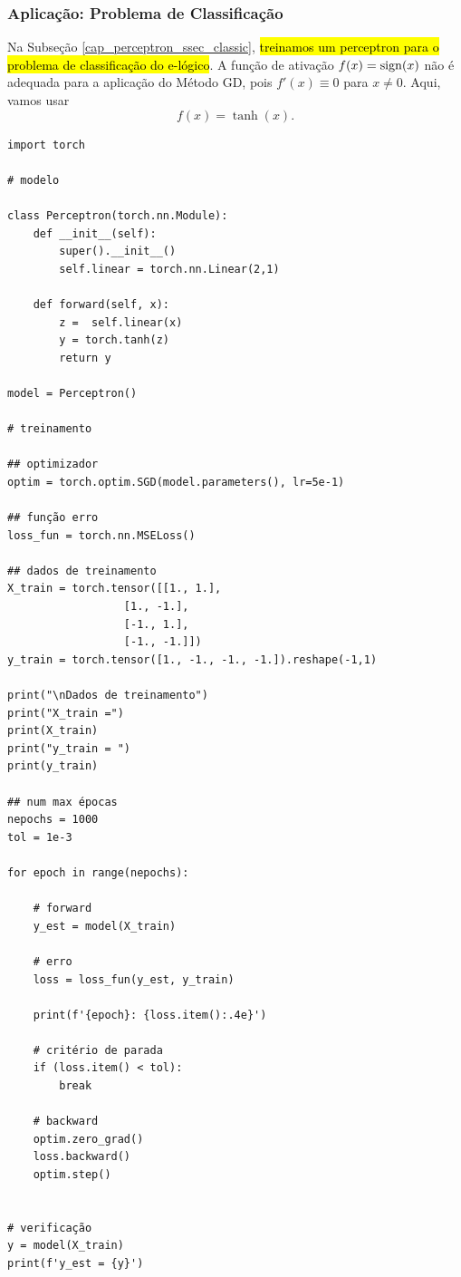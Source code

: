 \subsubsection{Aplicação: Problema de Classificação}

Na Subseção \ref{cap_perceptron_ssec_classic}, \hl{treinamos um perceptron para o problema de classificação do e-lógico}. A função de ativação $f(x) = \operatorname{sign}(x)$ não é adequada para a aplicação do Método GD, pois $f'(x) \equiv 0$ para $x\neq 0$. Aqui, vamos usar
\begin{equation}
  f(x) = \tanh(x).
\end{equation}

% 
\begin{lstlisting}[caption=perceptron\_gd.py, label=cap_perceptron_sec_train:cod:perceptron_gd]
import torch

# modelo

class Perceptron(torch.nn.Module):
    def __init__(self):
        super().__init__()
        self.linear = torch.nn.Linear(2,1)

    def forward(self, x):
        z =  self.linear(x)
        y = torch.tanh(z)
        return y

model = Perceptron()

# treinamento

## optimizador
optim = torch.optim.SGD(model.parameters(), lr=5e-1)

## função erro
loss_fun = torch.nn.MSELoss()

## dados de treinamento
X_train = torch.tensor([[1., 1.],
                  [1., -1.],
                  [-1., 1.],
                  [-1., -1.]])
y_train = torch.tensor([1., -1., -1., -1.]).reshape(-1,1)

print("\nDados de treinamento")
print("X_train =")
print(X_train)
print("y_train = ")
print(y_train)

## num max épocas
nepochs = 1000
tol = 1e-3

for epoch in range(nepochs):

    # forward
    y_est = model(X_train)

    # erro
    loss = loss_fun(y_est, y_train)

    print(f'{epoch}: {loss.item():.4e}')

    # critério de parada
    if (loss.item() < tol):
        break

    # backward
    optim.zero_grad()
    loss.backward()
    optim.step()


# verificação
y = model(X_train)
print(f'y_est = {y}')
\end{lstlisting}

